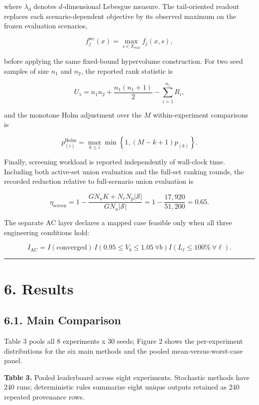 \documentclass[
  10pt,
  a4paper,
]{article}
\begin{document}
where \(\lambda_d\) denotes \(d\)-dimensional Lebesgue measure. The
tail-oriented readout replaces each scenario-dependent objective by its
observed maximum on the frozen evaluation scenarios,

\[
f_j^{\mathrm{wc}}(x)=\max_{s\in\mathcal{S}_{\mathrm{eval}}}f_j(x,s),
\]

before applying the same fixed-bound hypervolume construction. For two
seed samples of size \(n_1\) and \(n_2\), the reported rank statistic is

\[
U_1=n_1n_2+\frac{n_1(n_1+1)}{2}-\sum_{i=1}^{n_1}R_i,
\]

and the monotone Holm adjustment over the \(M\) within-experiment
comparisons is

\[
p^{\mathrm{Holm}}_{(i)}=\max_{k\leq i}\min\!\left\{1,(M-k+1)p_{(k)}\right\}.
\]

Finally, screening workload is reported independently of wall-clock
time. Including both active-set union evaluation and the full-set
ranking rounds, the recorded reduction relative to full-scenario union
evaluation is

\[
\eta_{\mathrm{screen}}=1-\frac{GN_uK+N_rN_p|\mathcal S|}{GN_u|\mathcal S|}=1-\frac{17{,}920}{51{,}200}=0.65.
\]

The separate AC layer declares a mapped case feasible only when all
three engineering conditions hold:

\[
I_{\mathrm{AC}}=I(\mathrm{converged})\,I\!\left(0.95\leq V_b\leq1.05\ \forall b\right)I\!\left(L_\ell\leq100\%\ \forall \ell\right).
\]

\begin{center}\rule{0.5\linewidth}{0.5pt}\end{center}

\section{6. Results}\label{results}

\subsection{6.1. Main Comparison}\label{main-comparison}

Table 3 pools all 8 experiments x 30 seeds; Figure 2 shows the
per-experiment distributions for the six main methods and the pooled
mean-versus-worst-case panel.

\textbf{Table 3.} Pooled leaderboard across eight experiments.
Stochastic methods have 240 runs; deterministic rules summarize eight
unique outputs retained as 240 repeated provenance rows.
\end{document}
